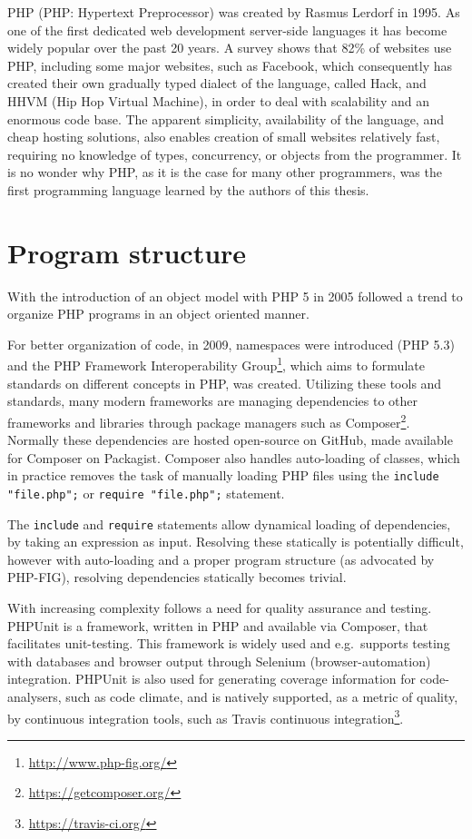 PHP (PHP: Hypertext Preprocessor) was created by Rasmus Lerdorf in 1995. As one of the first dedicated web development server-side languages it has become widely popular over the past 20 years. A survey shows that 82\% of websites use PHP, including some major websites, such as Facebook, which consequently has created their own gradually typed dialect of the language, called Hack, and HHVM (Hip Hop Virtual Machine), in order to deal with scalability and an enormous code base. The apparent simplicity, availability of the language, and cheap hosting solutions,  also enables creation of small websites relatively fast, requiring no knowledge of types, concurrency, or objects from the programmer. It is no wonder why PHP, as it is the case for many other programmers, was the first programming language learned by the authors of this thesis.

\section{Program structure}
With the introduction of an object model with PHP 5 in 2005 followed a trend to organize PHP programs in an object oriented manner. 

For better organization of code, in 2009, namespaces were introduced (PHP 5.3) and the PHP Framework Interoperability Group\footnote{\url{http://www.php-fig.org/}}, which aims to formulate standards on different concepts in PHP, was created. Utilizing these tools and standards, many modern frameworks are managing dependencies to other frameworks and libraries through package managers such as Composer\footnote{\url{https://getcomposer.org/}}. Normally these dependencies are hosted open-source on GitHub, made available for Composer on Packagist. Composer also handles auto-loading of classes, which in practice removes the task of manually loading PHP files using the \texttt{include "file.php";} or \texttt{require "file.php";} statement. 

The \texttt{include} and \texttt{require} statements allow dynamical loading of dependencies, by taking an expression as input. Resolving these statically is potentially difficult, however with auto-loading and a proper program structure (as advocated by PHP-FIG), resolving dependencies statically becomes trivial.

With increasing complexity follows a need for quality assurance and testing. PHPUnit is a framework, written in PHP and available via Composer, that facilitates unit-testing. This framework is widely used and e.g.\ supports testing with databases and browser output through Selenium (browser-automation) integration. PHPUnit is also used for generating coverage information for code-analysers, such as code climate, and is natively supported, as a metric of quality, by continuous integration tools, such as Travis continuous integration\footnote{\url{https://travis-ci.org/}}. 

